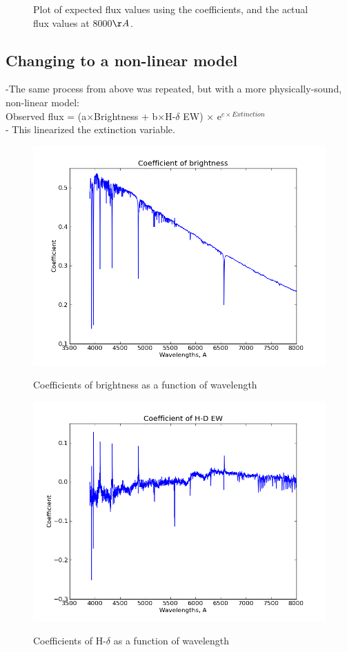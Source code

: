 \documentclass[preprint]{aastex}
\begin{document}
\begin{figure}
\caption{Plot of expected flux values using the coefficients, and the actual flux values at 8000$\AA$.}
\end{figure}

\subsection{Changing to a non-linear model}
-The same process from above was repeated, but with a more physically-sound, non-linear model:\\
Observed flux = (a$\times$Brightness + b$\times$H-$\delta$ EW) $\times$ e$^{c \times Extinction}$\\
- This linearized the extinction variable.
\begin{figure}
\includegraphics[width=12cm]{coeffsdr9experr0}\\
\caption{Coefficients of brightness as a function of wavelength}
\end{figure}
\begin{figure}
\includegraphics[width=12cm]{coeffsdr9experr1}\\
\caption{Coefficients of H-$\delta$ as a function of wavelength}
\end{figure}
\end{document}

